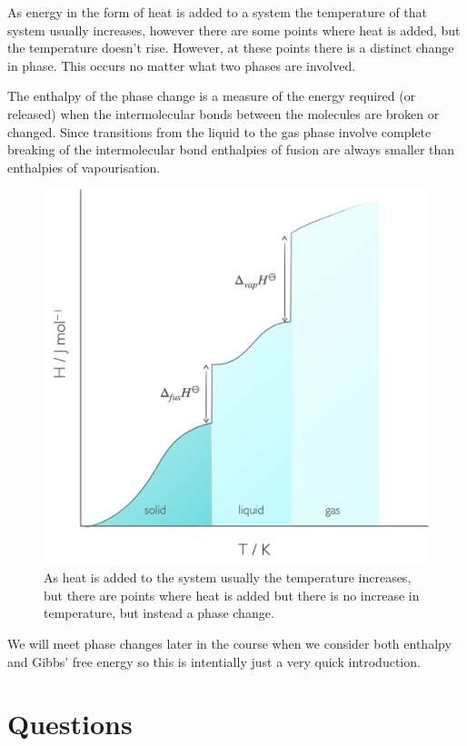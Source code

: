 \documentclass[
]{book}
\begin{document}
As energy in the form of heat is added to a system the temperature of that system usually increases, however there are some points where heat is added, but the temperature doesn't rise. However, at these points there is a distinct change in phase. This occurs no matter what two phases are involved.

The enthalpy of the phase change is a measure of the energy required (or released) when the intermolecular bonds between the molecules are broken or changed. Since transitions from the liquid to the gas phase involve complete breaking of the intermolecular bond enthalpies of fusion are always smaller than enthalpies of vapourisation.

\begin{figure}

{\centering \includegraphics[width=0.7\linewidth]{images/enthalpyphasechange} 

}

\caption{As heat is added to the system usually the temperature increases, but there are points where heat is added but there is no increase in temperature, but instead a phase change.}\label{fig:enthalpyphasechange}
\end{figure}

We will meet phase changes later in the course when we consider both enthalpy and Gibbs' free energy so this is intentially just a very quick introduction.

\hypertarget{questions}{%
\section{Questions}\label{questions}}
\end{document}
